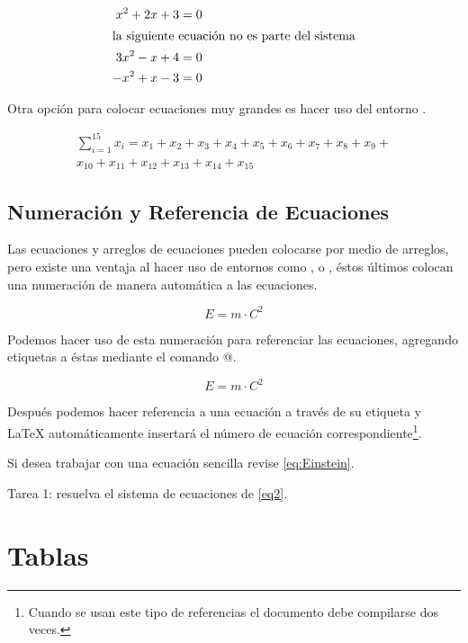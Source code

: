\documentclass[letterpaper,12pt]{book}
\begin{document}
\begin{align}
	x^2 + 2x + 3 &= 0 \\
	\intertext{la siguiente ecuación no es parte del sistema}
	3x^2 - x + 4 &= 0 \nonumber \\
	-x^2 + x - 3 &= 0
\end{align}

Otra opción para colocar ecuaciones muy grandes es hacer uso del
entorno \verb@multline@.

\begin{multline}
 \sum_{i=1}^{15} x_i = x_1 + x_2 + x_3 + x_4 + x_5 + x_6 + x_7 + 	
 	x_8 + x_9 + \\
 	 x_{10} + x_{11} + x_{12} + x_{13} + x_{14} + x_{15}
\end{multline}

\section{Numeración y Referencia de Ecuaciones}

Las ecuaciones y arreglos de ecuaciones pueden colocarse por medio de arreglos, pero existe una ventaja
al hacer uso de entornos como \verb@equation@, \verb@align@ o \verb@aligned@, éstos últimos colocan una
numeración de manera automática a las ecuaciones.

\begin{equation}
	E = m\cdot C^2
\end{equation}

Podemos hacer uso de esta numeración para referenciar las ecuaciones, agregando etiquetas a éstas mediante
el comando \verb@\label{}@.

\begin{equation} \label{eq:Einstein}
	E = m\cdot C^2
\end{equation}

Después podemos hacer referencia a una ecuación a través de su etiqueta y \LaTeX{} automáticamente insertará
el número de ecuación correspondiente\footnote{Cuando se usan este tipo de referencias el documento debe 
compilarse dos veces.}.

Si desea trabajar con una ecuación sencilla revise \eqref{eq:Einstein}.

Tarea 1: resuelva el sistema de ecuaciones de \eqref{eq2}.

\newpage

\chapter{Tablas}
\end{document}
